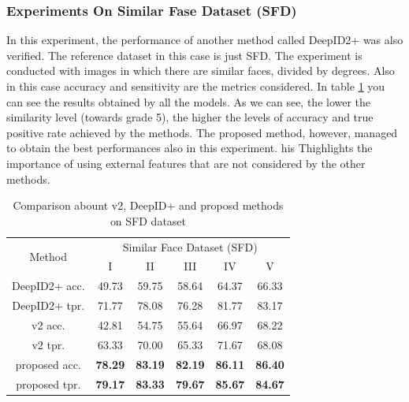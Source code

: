 \subsubsection{Experiments On Similar Fase Dataset (SFD)}
In this experiment, the performance of another method called DeepID2+ \cite{0902694017} 
was also verified. The reference dataset in this case is just SFD. The experiment 
is conducted with images in which there are similar faces, divided by 
degrees. Also in this case accuracy and sensitivity are the metrics considered. 
In table \ref{SFDCompMeth} you can see the results obtained by all the models. As we 
can see, the lower the similarity level (towards grade 5), the higher the levels 
of accuracy and true positive rate achieved by the methods. The proposed 
method, however, managed to obtain the best performances also in this experiment. 
his Thighlights the importance of using external features that are 
not considered by the other methods.
\begin{table}[h!]
    \centering
    \begin{adjustbox}{max width=\textwidth}
    \begin{tabular}{|c|ccccc|}
        \hline
        \multirow{2}{*}{Method} & \multicolumn{5}{c|}{Similar Face Dataset (SFD)}\\
        & \RN{1} & \RN{2} & \RN{3} & \RN{4} & \RN{5}\\
        \hline
        DeepID2+ acc. & 49.73 & 59.75 & 58.64 & 64.37 & 66.33\\
        DeepID2+ tpr. & 71.77 & 78.08 & 76.28 & 81.77 & 83.17\\
        \hline
        v2 acc. & 42.81 & 54.75 & 55.64 & 66.97 & 68.22\\
        v2 tpr. & 63.33 & 70.00 & 65.33 & 71.67 & 68.08\\
        \hline
        proposed acc. & \bfseries{78.29} & \bfseries{83.19} & \bfseries{82.19} & \bfseries{86.11} & \bfseries{86.40}\\
        proposed tpr. & \bfseries{79.17} & \bfseries{83.33} & \bfseries{79.67} & \bfseries{85.67} & \bfseries{84.67}\\
        \hline
    \end{tabular}
    \end{adjustbox}
    \caption{Comparison abount v2, DeepID+ and proposd methods on SFD dataset}
    \label{SFDCompMeth}
\end{table}

